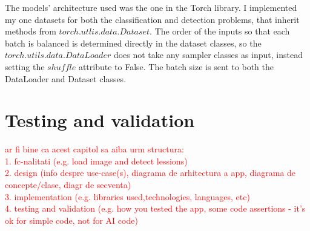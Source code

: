 The models' architecture used was the one in the Torch library. I implemented my one datasets for both the classification and detection problems, that inherit methods from \(torch.utlis.data.Dataset\). The order of the inputs so that each batch is balanced is determined directly in the dataset classes, so the \(torch.utils.data.DataLoader\) does not take any sampler classes as input, instead setting the \(shuffle\) attribute to False. The batch size is sent to both the DataLoader and Dataset classes.

\section{Testing and validation}

\textcolor{red}{ar fi bine ca acest capitol sa aiba urm structura:\\
1. fc-nalitati (e.g. load image and detect lessions)\\
2. design (info despre use-case(s), diagrama de arhitectura a app, diagrama de concepte/clase, diagr de secventa)\\
3. implementation (e.g. libraries used,technologies, languages, etc)\\
4. testing and validation (e.g. how you tested the app, some code assertions - it's ok for simple code, not for AI code)\\}